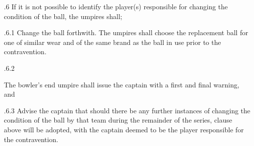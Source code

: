 \documentclass[12pt]{article}
\begin{document}
\vspace{\baselineskip}
\begin{adjustwidth}{0.5in}{0.26in}
{\fontsize{9pt}{10.8pt}.6 \tabto{0.49in} If it is not possible to identify the player(s) responsible for changing the condition of the ball, the umpires shall;\par}\par

\end{adjustwidth}


\vspace{\baselineskip}

\vspace{\baselineskip}

\vspace{\baselineskip}

\vspace{\baselineskip}

\vspace{\baselineskip}
\begin{Center}
{\fontsize{8pt}{9.6pt}\par}
\end{Center}\par


\vspace{\baselineskip}

\vspace{\baselineskip}
\begin{adjustwidth}{1.18in}{0.03in}
{\fontsize{9pt}{10.8pt}.6.1 \tabto{1.17in} Change the ball forthwith. The umpires shall choose the replacement ball for one of similar wear and of the same brand as the ball in use prior to the contravention.\par}\par

\end{adjustwidth}


\vspace{\baselineskip}
\begin{adjustwidth}{0.49in}{0.0in}
{\fontsize{9pt}{10.8pt}.6.2 \tabto{1.17in} {\fontsize{8pt}{9.6pt}\selectfont The bowler’s end umpire shall issue the captain with a first and final warning, and\par}\par}\par

\end{adjustwidth}


\vspace{\baselineskip}
\begin{adjustwidth}{1.18in}{0.04in}
{\fontsize{9pt}{10.8pt}.6.3 \tabto{1.17in} Advise the captain that should there be any further instances of changing the condition of the ball by that team during the remainder of the series, clause above will be adopted, with the captain deemed to be the player responsible for the contravention.\par}\par

\end{adjustwidth}
\end{document}
